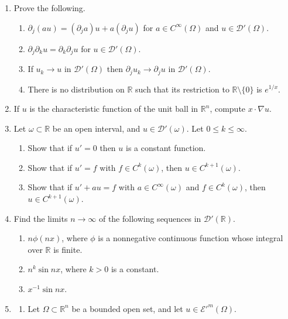 \documentclass[11pt]{amsart}
\newcommand{\R}{\mathbb{R}}
\newcommand{\tstD}{\mathscr{D}}
\newcommand{\tstE}{\mathscr{E}}
\begin{document}
\begin{enumerate}[1.]
\begin{enumerate}[{\em a)}]
\item
$\partial_x\log |x|$;
\item
$\partial_2f$, where $f\in\tstD'(\R^2)$ is the distribution from {\em b)} of the previous exercise.
\end{enumerate}
\item
Prove the following.
\begin{enumerate}[{\em a)}]
\item
$\partial_j (au) = (\partial_j a) u + a (\partial_j u)$ for $a\in C^\infty(\Omega)$ and $u\in\tstD'(\Omega)$.
\item
$\partial_j \partial_k u = \partial_k \partial_j u$ for $u\in\tstD'(\Omega)$.
\item
If $u_k\to u$ in $\tstD'(\Omega)$ then $\partial_ju_k\to\partial_ju$ in $\tstD'(\Omega)$.
\item
There is no distribution on $\R$ such that its restriction to $\R\setminus\{0\}$ is $e^{1/x}$.
\end{enumerate}
\item
If $u$ is the characteristic function of the unit ball in $\R^n$, compute $x\cdot\nabla u$.
\item
Let $\omega\subset\R$ be an open interval, and $u\in\tstD'(\omega)$. Let $0\leq k\leq \infty$.
\begin{enumerate}[{\em a)}]
\item
Show that if $u'=0$ then $u$ is a constant function.
\item
Show that if $u'=f$ with $f\in C^{k}(\omega)$, then $u\in C^{k+1}(\omega)$.
\item
Show that if $u'+au=f$ with $a\in C^{\infty}(\omega)$ and $f\in C^{k}(\omega)$, then $u\in C^{k+1}(\omega)$.
\end{enumerate}
\item
Find the limits $n\to\infty$ of the following sequences in $\tstD'(\R)$.
\begin{enumerate}[{\em a)}]
\item
$n\phi(nx)$, where $\phi$ is a nonnegative continuous function whose integral over $\R$ is finite.
\item
$n^k\sin nx$, where $k>0$ is a constant.
\item
$x^{-1}\sin nx$.
\end{enumerate}
\item
\begin{enumerate}[{\em a)}]
\item
Let $\Omega\subset\R^n$ be a bounded open set, and let $u\in\tstE'^m(\Omega)$.

\end{enumerate}
\end{enumerate}
\end{document}
